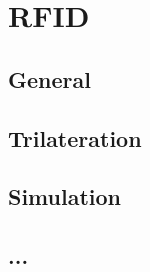 \section{RFID} 

\subsection{General}

\subsection{Trilateration}

\subsection{Simulation}

\subsection{...}